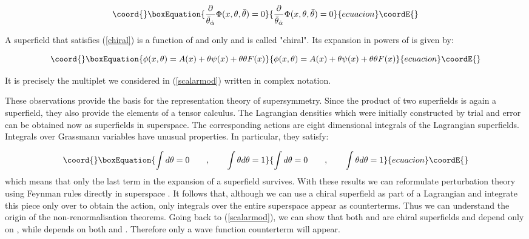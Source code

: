 \documentclass[a4paper,11pt]{article}
\begin{document}
\begin{equation}\coord{}\boxEquation{
\label{chiral}
\frac{\partial}{\bar{\theta}_{\dot{\alpha}}}\Phi (x, \theta ,\bar{\theta}) = 0
}{
\frac{\partial}{\bar{\theta}_{\dot{\alpha}}}\Phi (x, \theta ,\bar{\theta}) = 0
}{ecuacion}\coordE{}\end{equation}

A superfield that satisfies (\ref{chiral}) is a function of \coordHE{} and
\myHighlight{$\theta$}\coordHE{} only and is called "chiral". Its expansion in powers
of \myHighlight{$\theta$}\coordHE{} is given by:

\begin{equation}\coord{}\boxEquation{
\label{chiral1}
\phi (x, \theta ) = A(x) + \theta \psi (x) + \theta \theta F(x)
}{
\phi (x, \theta ) = A(x) + \theta \psi (x) + \theta \theta F(x)
}{ecuacion}\coordE{}\end{equation}

It is precisely the multiplet we considered in (\ref{scalarmod}) written in 
complex notation.

These
observations provide the basis for the representation theory of
supersymmetry. Since the product of two superfields is again a
superfield, they also provide the elements of a tensor calculus. The
Lagrangian densities which were initially constructed by trial and
error can be obtained now as superfields in superspace. The
corresponding actions are eight dimensional integrals of the Lagrangian
superfields. Integrals over Grassmann variables have unusual properties. In 
particular, they satisfy:

\begin{equation}\coord{}\boxEquation{
\label{Grasint}
\int d\theta = 0  \qquad , \qquad \int \theta  d\theta = 1
}{
\int d\theta = 0  \qquad , \qquad \int \theta  d\theta = 1
}{ecuacion}\coordE{}\end{equation}
\noindent
which means that only the last term in the expansion of a superfield survives. 
With these results we can reformulate perturbation theory using Feynman rules 
directly in superspace \cite{Gris..}. It follows that, although we can 
use a chiral superfield as part of a Lagrangian and integrate this piece only over 
\myHighlight{$\theta$}\coordHE{} to obtain the action, only integrals over the entire superspace appear as 
counterterms. Thus we can understand the origin of the non-renormalisation theorems. 
Going back to (\ref{scalarmod}), we can show that both \coordHE{} and 
\coordHE{} are chiral superfields and depend only on \myHighlight{$\theta$}\coordHE{}, while 
\coordHE{} depends on both \myHighlight{$\theta$}\coordHE{} and \myHighlight{$\bar{\theta}$}\coordHE{}. Therefore only a wave 
function counterterm will appear.
\end{document}
